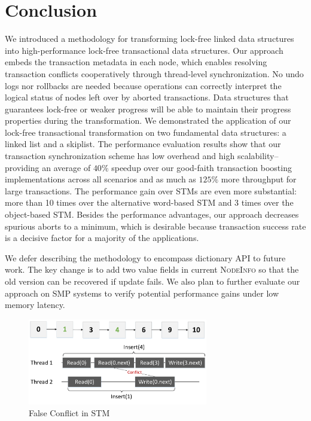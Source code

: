 \documentclass[]{sig-alternate-05-2015}
\begin{document}
\section{Conclusion}
\label{sec:conclusion}
We introduced a methodology for transforming lock-free linked data structures into high-performance lock-free transactional data structures. 
Our approach embeds the transaction metadata in each node, which enables resolving transaction conflicts cooperatively through thread-level synchronization.
No undo logs nor rollbacks are needed because operations can correctly interpret the logical status of nodes left over by aborted transactions.
Data structures that guarantees lock-free or weaker progress will be able to maintain their progress properties during the transformation.
We demonstrated the application of our lock-free transactional transformation on two fundamental data structures: a linked list and a skiplist.  
The performance evaluation results show that our transaction synchronization scheme has low overhead and high scalability--providing an average of $40\%$ speedup over our good-faith transaction boosting implementations across all scenarios and as much as $125\%$ more throughput for large transactions.
The performance gain over STMs are even more substantial: more than 10 times over the alternative word-based STM and 3 times over the object-based STM.
Besides the performance advantages, our approach decreases spurious aborts to a minimum, which is desirable because transaction success rate is a decisive factor for a majority of the applications.

We defer describing the methodology to encompass dictionary API to future work.
The key change is to add two value fields in current \textsc{NodeInfo} so that the old version can be recovered if update fails.
We also plan to further evaluate our approach on SMP systems to verify potential performance gains under low memory latency.

\begin{figure}[p]
    \centering
    \includegraphics[width=0.7\textwidth]{figure/stmconflict.pdf}
    \caption{False Conflict in STM}
    \label{fig:stmconflict}
\end{figure}
\end{document}
